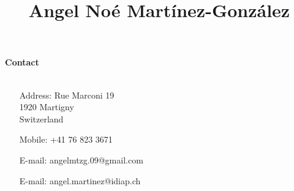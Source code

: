 \documentclass[10 pt]{article}
\title{\textbf{Angel Noé Martínez-González}}
\date{}
\newcommand{\mypartitle}[2][2.]{\vspace*{-#1 ex}~\\{\noindent {\bf #2}}}
\begin{document}
\maketitle
\vspace{-1.5cm}
\hspace{-.5cm}\textbf{Contact}\\

\vspace{-0.3cm}
\ \ \ \ \ \begin{minipage}{0.5\linewidth}

\begin{itemize}[noitemsep]

\item[Address:] Rue Marconi 19\\
 1920 Martigny\\
 Switzerland

\end{itemize}

\end{minipage}\begin{minipage}{0.3\linewidth}

\begin{itemize}[noitemsep]

\item[Mobile:] +41 76 823 3671
\item[E-mail:] angelmtzg.09@gmail.com
\item[E-mail:] angel.martinez@idiap.ch

\end{itemize}

\end{minipage}

\bigskip


%
%
%
%
\end{document}
